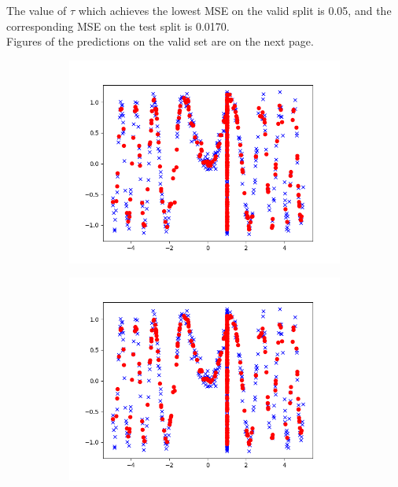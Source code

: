 \begin{answer}
The value of $\tau$ which achieves the lowest MSE on the valid split is 0.05, and the corresponding MSE on the test split is 0.0170.\\
Figures of the predictions on the valid set are on the next page.
\begin{figure}[htb]
    \begin{subfigure}{0.5\linewidth}
        \centering
        \includegraphics[width=\linewidth]{tex/tau_0.03.png}
    \end{subfigure}
    \begin{subfigure}{0.5\linewidth}
        \centering
        \includegraphics[width=\linewidth]{tex/tau_0.05.png}

\end{subfigure}
\end{figure}
\end{answer}
